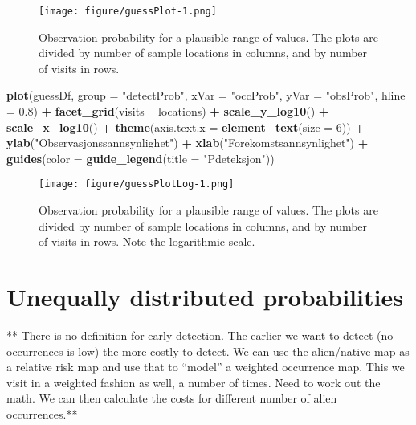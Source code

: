 \documentclass[]{article}
\newenvironment{Shaded}{\begin{snugshade}}{\end{snugshade}}
\newcommand{\KeywordTok}[1]{\textcolor[rgb]{0.13,0.29,0.53}{\textbf{#1}}}
\newcommand{\DataTypeTok}[1]{\textcolor[rgb]{0.13,0.29,0.53}{#1}}
\newcommand{\DecValTok}[1]{\textcolor[rgb]{0.00,0.00,0.81}{#1}}
\newcommand{\FloatTok}[1]{\textcolor[rgb]{0.00,0.00,0.81}{#1}}
\newcommand{\StringTok}[1]{\textcolor[rgb]{0.31,0.60,0.02}{#1}}
\newcommand{\OperatorTok}[1]{\textcolor[rgb]{0.81,0.36,0.00}{\textbf{#1}}}
\newcommand{\NormalTok}[1]{#1}
\begin{document}
\begin{figure}
\centering
\texttt{[image: figure/guessPlot-1.png]}
\caption{Observation probability for a plausible range of values. The
plots are divided by number of sample locations in columns, and by
number of visits in rows.}
\end{figure}

\begin{Shaded}
\begin{Highlighting}[]
\KeywordTok{plot}\NormalTok{(guessDf, }\DataTypeTok{group =} \StringTok{"detectProb"}\NormalTok{, }\DataTypeTok{xVar =} \StringTok{"occProb"}\NormalTok{, }\DataTypeTok{yVar =} \StringTok{"obsProb"}\NormalTok{, }\DataTypeTok{hline =} \FloatTok{0.8}\NormalTok{) }\OperatorTok{+}\StringTok{ }
\StringTok{    }\KeywordTok{facet_grid}\NormalTok{(visits }\OperatorTok{~}\StringTok{ }\NormalTok{locations) }\OperatorTok{+}\StringTok{ }\KeywordTok{scale_y_log10}\NormalTok{() }\OperatorTok{+}\StringTok{ }\KeywordTok{scale_x_log10}\NormalTok{() }\OperatorTok{+}\StringTok{ }\KeywordTok{theme}\NormalTok{(}\DataTypeTok{axis.text.x =} \KeywordTok{element_text}\NormalTok{(}\DataTypeTok{size =} \DecValTok{6}\NormalTok{)) }\OperatorTok{+}\StringTok{ }
\StringTok{    }\KeywordTok{ylab}\NormalTok{(}\StringTok{"Observasjonssannsynlighet"}\NormalTok{) }\OperatorTok{+}\StringTok{ }\KeywordTok{xlab}\NormalTok{(}\StringTok{"Forekomstsannsynlighet"}\NormalTok{) }\OperatorTok{+}\StringTok{ }\KeywordTok{guides}\NormalTok{(}\DataTypeTok{color =} \KeywordTok{guide_legend}\NormalTok{(}\DataTypeTok{title =} \StringTok{"Pdeteksjon"}\NormalTok{))}
\end{Highlighting}
\end{Shaded}

\begin{figure}
\centering
\texttt{[image: figure/guessPlotLog-1.png]}
\caption{Observation probability for a plausible range of values. The
plots are divided by number of sample locations in columns, and by
number of visits in rows. Note the logarithmic scale.
\label{guessPlotLog}}
\end{figure}

\section{Unequally distributed
probabilities}\label{unequally-distributed-probabilities}

** There is no definition for early detection. The earlier we want to
detect (no occurrences is low) the more costly to detect. We can use the
alien/native map as a relative risk map and use that to ``model'' a
weighted occurrence map. This we visit in a weighted fashion as well, a
number of times. Need to work out the math. We can then calculate the
costs for different number of alien occurrences.**
\end{document}
